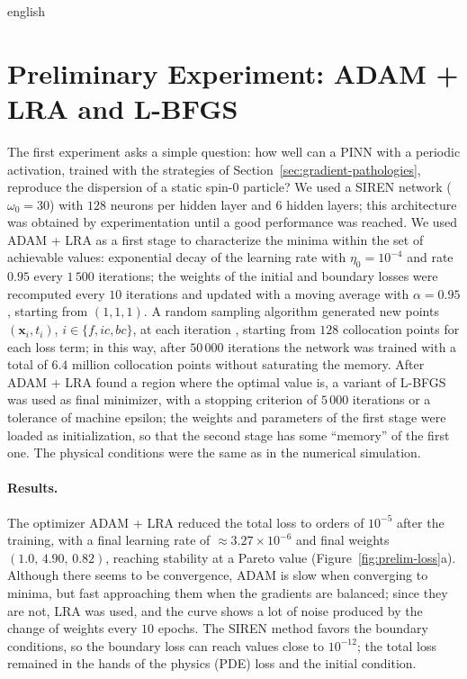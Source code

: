 \documentclass[../0000.tex]{subfiles}
\begin{document}
\begin{hyphenrules}{english}
\section{Preliminary Experiment: ADAM + LRA and L-BFGS}\label{sec:exp-preliminary}

The first experiment asks a simple question: how well can a PINN with a periodic activation, trained with
the strategies of Section~\ref{sec:gradient-pathologies}, reproduce the dispersion of a static spin-0 particle?
We used a SIREN network ($\omega_0=30$) with $128$ neurons per hidden layer and $6$ hidden layers; this
architecture was obtained by experimentation until a good performance was reached. We used ADAM + LRA as a
first stage to characterize the minima within the set of achievable values: exponential decay of the
learning rate with $\eta_0=10^{-4}$ and rate $0.95$ every $1\,500$ iterations; the weights of the initial
and boundary losses were recomputed every $10$ iterations and updated with a moving average with
$\alpha=0.95$, starting from $(1,1,1)$. A random sampling algorithm generated new points
$(\mathbf{x}_i,t_i)$, $i\in\{f,ic,bc\}$, at each iteration \cite{wang2021gradient,liu2022}, starting from $128$
collocation points for each loss term; in this way, after $50\,000$ iterations the network was trained
with a total of $6.4$ million collocation points without saturating the memory. After ADAM + LRA found a region where the
optimal value is, a variant of L-BFGS was used as final minimizer, with a stopping criterion of $5\,000$
iterations or a tolerance of machine epsilon; the weights and parameters of the first stage were loaded as
initialization, so that the second stage has some ``memory'' of the first one. The physical conditions
were the same as in the numerical simulation.

\paragraph{Results.}
The optimizer ADAM + LRA reduced the total loss to orders of $10^{-5}$ after the training, with a final
learning rate of $\approx3.27\times10^{-6}$ and final weights $(1.0,\,4.90,\,0.82)$, reaching stability at
a Pareto value (Figure~\ref{fig:prelim-loss}a). Although there seems to be convergence, ADAM is slow when
converging to minima, but fast approaching them when the gradients are balanced; since they are not, LRA
was used, and the curve shows a lot of noise produced by the change of weights every $10$ epochs. The
SIREN method favors the boundary conditions, so the boundary loss can reach values close to $10^{-12}$; the
total loss remained in the hands of the physics (PDE) loss and the initial condition.


\end{hyphenrules}
\end{document}
